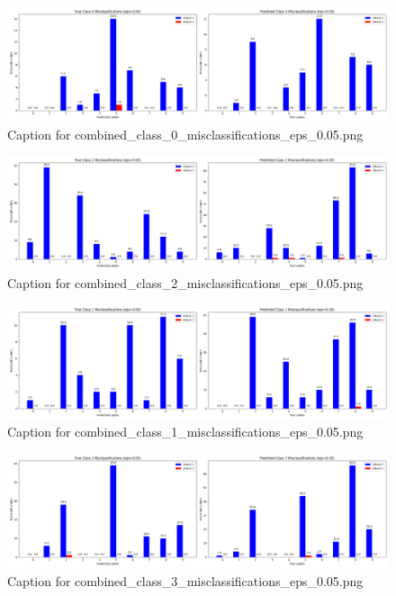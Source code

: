 \documentclass[11pt,onside]{article}
\begin{document}
\begin{figure}[ht]
\centering
\includegraphics[width=1\textwidth]{combined_class_boundary_pgd/combined_class_0_misclassifications_eps_0.05.png}
\caption{Caption for combined_class_0_misclassifications_eps_0.05.png}
\label{fig:combined_class_0_misclassifications_eps_0.05.png}
\end{figure}

\begin{figure}[ht]
\centering
\includegraphics[width=1\textwidth]{combined_class_boundary_pgd/combined_class_2_misclassifications_eps_0.05.png}
\caption{Caption for combined_class_2_misclassifications_eps_0.05.png}
\label{fig:combined_class_2_misclassifications_eps_0.05.png}
\end{figure}

\begin{figure}[ht]
\centering
\includegraphics[width=1\textwidth]{combined_class_boundary_pgd/combined_class_1_misclassifications_eps_0.05.png}
\caption{Caption for combined_class_1_misclassifications_eps_0.05.png}
\label{fig:combined_class_1_misclassifications_eps_0.05.png}
\end{figure}


\begin{figure}[ht]
\centering
\includegraphics[width=1\textwidth]{combined_class_boundary_pgd/combined_class_3_misclassifications_eps_0.05.png}
\caption{Caption for combined_class_3_misclassifications_eps_0.05.png}
\label{fig:combined_class_3_misclassifications_eps_0.05.png}
\end{figure}
\end{document}
